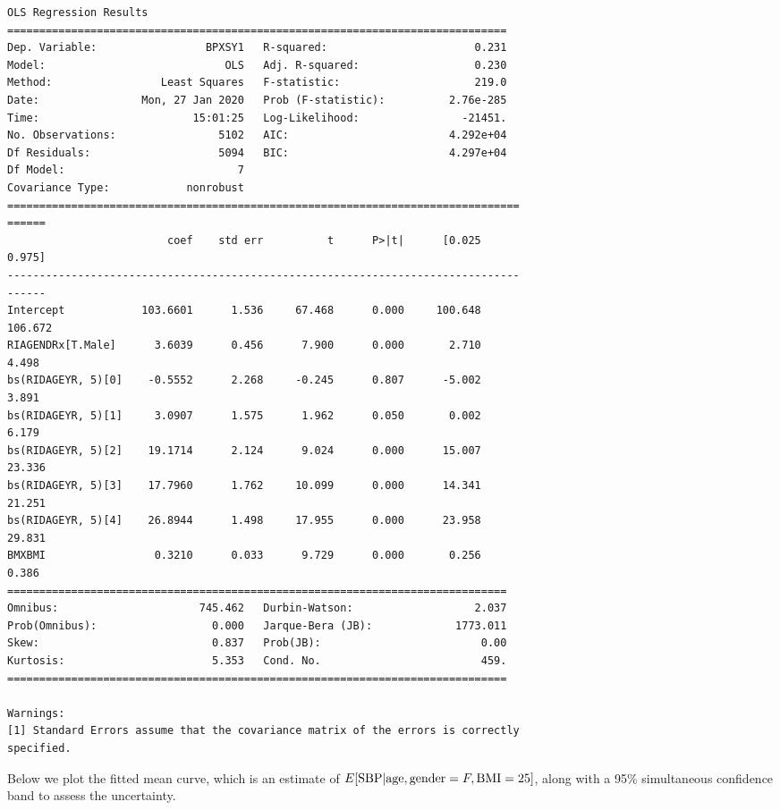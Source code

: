 \documentclass[11pt]{article}
\begin{document}
    \begin{Verbatim}[commandchars=\\\{\}]
                            OLS Regression Results
==============================================================================
Dep. Variable:                 BPXSY1   R-squared:                       0.231
Model:                            OLS   Adj. R-squared:                  0.230
Method:                 Least Squares   F-statistic:                     219.0
Date:                Mon, 27 Jan 2020   Prob (F-statistic):          2.76e-285
Time:                        15:01:25   Log-Likelihood:                -21451.
No. Observations:                5102   AIC:                         4.292e+04
Df Residuals:                    5094   BIC:                         4.297e+04
Df Model:                           7
Covariance Type:            nonrobust
================================================================================
======
                         coef    std err          t      P>|t|      [0.025
0.975]
--------------------------------------------------------------------------------
------
Intercept            103.6601      1.536     67.468      0.000     100.648
106.672
RIAGENDRx[T.Male]      3.6039      0.456      7.900      0.000       2.710
4.498
bs(RIDAGEYR, 5)[0]    -0.5552      2.268     -0.245      0.807      -5.002
3.891
bs(RIDAGEYR, 5)[1]     3.0907      1.575      1.962      0.050       0.002
6.179
bs(RIDAGEYR, 5)[2]    19.1714      2.124      9.024      0.000      15.007
23.336
bs(RIDAGEYR, 5)[3]    17.7960      1.762     10.099      0.000      14.341
21.251
bs(RIDAGEYR, 5)[4]    26.8944      1.498     17.955      0.000      23.958
29.831
BMXBMI                 0.3210      0.033      9.729      0.000       0.256
0.386
==============================================================================
Omnibus:                      745.462   Durbin-Watson:                   2.037
Prob(Omnibus):                  0.000   Jarque-Bera (JB):             1773.011
Skew:                           0.837   Prob(JB):                         0.00
Kurtosis:                       5.353   Cond. No.                         459.
==============================================================================

Warnings:
[1] Standard Errors assume that the covariance matrix of the errors is correctly
specified.
\end{Verbatim}

    Below we plot the fitted mean curve, which is an estimate of
\(E[{\rm SBP} | {\rm age}, {\rm gender}=F, {\rm BMI}=25]\), along with a
95\% simultaneous confidence band to assess the uncertainty.
\end{document}
